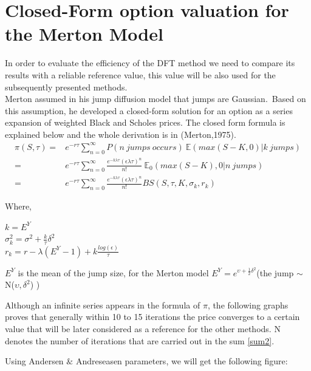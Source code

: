 \documentclass[12pt]{report}
\begin{document}
\section{Closed-Form option valuation for the Merton Model}
In order to evaluate the efficiency of the DFT method we need to  compare its results with a reliable reference value, this value will be also used for the subsequently presented methods.\\
Merton assumed in his jump diffusion model that jumps are Gaussian.~Based on this assumption, he developed a closed-form solution for an option as a series expansion of weighted Black and  Scholes prices. The closed form formula is explained below and the whole derivation is in (Merton,1975).
\begin{align}
\label{sum2}
\pi(S,\tau)=& e^{-r\tau} \sum \limits_{n=0}^{\infty} P(n~jumps~occurs)~\mathbb{E}(max(S-K,0)|k~jumps) \nonumber \\
=& e^{-r\tau} \sum \limits_{n=0}^{\infty} \frac{e^{-k \lambda \tau}(\epsilon \lambda \tau)^n}{n!} ~ \mathbb{E}_0(max(S-K),0|n~jumps)\nonumber \\
=& e^{-r\tau} \sum \limits_{n=0}^{\infty} \frac{e^{-k \lambda \tau}(\epsilon \lambda \tau)^n}{n!} BS(S,\tau,K,\sigma_k,r_k)
\end{align}

Where,
\begin{center}
$k=E^Y$\\
$\sigma_k^2=\sigma^2+\frac{k}{\tau} \delta^2$\\
$r_k=r-\lambda(E^Y-1)+k \frac{log(\epsilon)}{\tau}$\\
\end{center} 
$E^Y$ is the mean of the jump size, for the Merton model $E^Y = e^{\upsilon+\frac{1}{2}\delta^2}$(the jump $\sim$ N($\upsilon,\delta^2$) )

Although an infinite series appears in the formula of $\pi$, the following graphs proves that  generally within  10 to 15 iterations the price converges to a certain value that will be later considered  as a reference for the other methods.
N denotes the number of iterations that are carried out in the sum \eqref{sum2}.



Using Andersen $\&$ Andreseasen parameters, we will get the following figure: 
\end{document}

